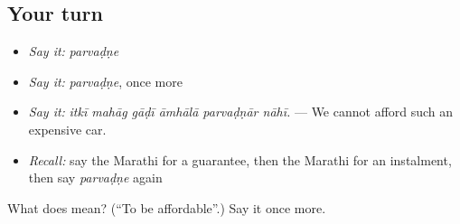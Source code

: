 \subsection*{Your turn}
\begin{itemize}
\raggedright
  \item \emph{Say it:} \emph{parvaḍṇe}
  \item \emph{Say it:} \emph{parvaḍṇe}, once more
  \item \emph{Say it:} \emph{itkī mahāg gāḍī āmhālā parvaḍṇār nāhī.} — We cannot afford such an expensive car.
  \item \emph{Recall:} say the Marathi for a guarantee, then the Marathi for an instalment, then say \emph{parvaḍṇe} again
\end{itemize}

\begin{tcolorbox}[breakable,colback=teal!4,colframe=teal!35!black,title={Before you move on}]
What does  mean? (\textquotedblleft{}To be affordable\textquotedblright{}.) Say it once more.
\end{tcolorbox}
